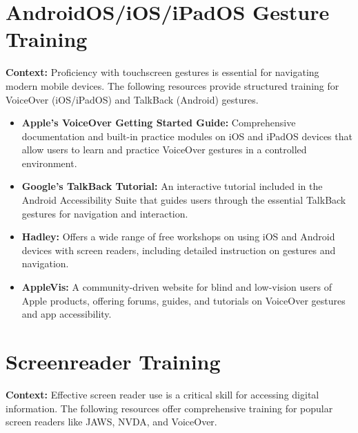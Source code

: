 \section{AndroidOS/iOS/iPadOS Gesture Training}\label{app4:gesture-training}

\noindent
\textbf{Context:} Proficiency with touchscreen gestures is essential for navigating modern mobile devices. The following resources provide structured training for VoiceOver (iOS/iPadOS) and TalkBack (Android) gestures.

\begin{itemize}
	\item \textbf{Apple's VoiceOver Getting Started Guide:} Comprehensive documentation and built-in practice modules on iOS and iPadOS devices that allow users to learn and practice VoiceOver gestures in a controlled environment.
	\item \textbf{Google's TalkBack Tutorial:} An interactive tutorial included in the Android Accessibility Suite that guides users through the essential TalkBack gestures for navigation and interaction.
	\item \textbf{Hadley:} Offers a wide range of free workshops on using iOS and Android devices with screen readers, including detailed instruction on gestures and navigation.
	\item \textbf{AppleVis:} A community-driven website for blind and low-vision users of Apple products, offering forums, guides, and tutorials on VoiceOver gestures and app accessibility.
\end{itemize}

\section[Screenreader Training]{Screenreader Training}\label{app4:screenreader-training}

\noindent
\textbf{Context:} Effective screen reader use is a critical skill for accessing digital information. The following resources offer comprehensive training for popular screen readers like JAWS, NVDA, and VoiceOver.

